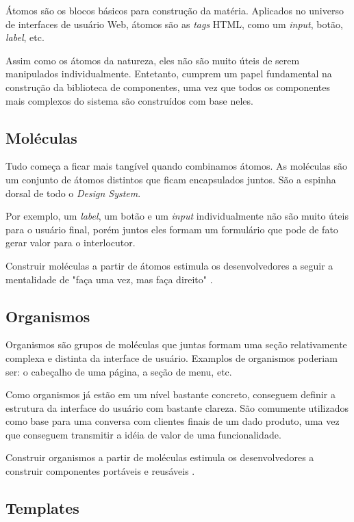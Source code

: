 Átomos são os blocos básicos para construção da matéria. Aplicados no universo de interfaces de usuário Web, átomos são as \textit{tags} HTML, como um \textit{input}, botão, \textit{label}, etc.

Assim como os átomos da natureza, eles não são muito úteis de serem manipulados individualmente. Entetanto, cumprem um papel fundamental na construção da biblioteca de componentes, uma vez que todos os componentes mais complexos do sistema são construídos com base neles.

\subsection{Moléculas}
\label{subsec:moleculas}

Tudo começa a ficar mais tangível quando combinamos átomos. As moléculas são um conjunto de átomos distintos que ficam encapsulados juntos. São a espinha dorsal de todo o \textit{Design System}.

Por exemplo, um \textit{label}, um botão e um \textit{input} individualmente não são muito úteis para o usuário final, porém juntos eles formam um formulário que pode de fato gerar valor para o interlocutor.

Construir moléculas a partir de átomos estimula os desenvolvedores a seguir a mentalidade de "faça uma vez, mas faça direito" \cite{frostAtomicDesign}.

\subsection{Organismos}
\label{subsec:organismos}

Organismos são grupos de moléculas que juntas formam uma seção relativamente complexa e distinta da interface de usuário. Examplos de organismos poderiam ser: o cabeçalho de uma página, a seção de menu, etc.

Como organismos já estão em um nível bastante concreto, conseguem definir a estrutura da interface do usuário com bastante clareza. São comumente utilizados como base para uma conversa com clientes finais de um dado produto, uma vez que conseguem transmitir a idéia de valor de uma funcionalidade.

Construir organismos a partir de moléculas estimula os desenvolvedores a construir componentes portáveis e reusáveis \cite{frostAtomicDesign}.

\subsection{Templates}
\label{subsec:templates}

